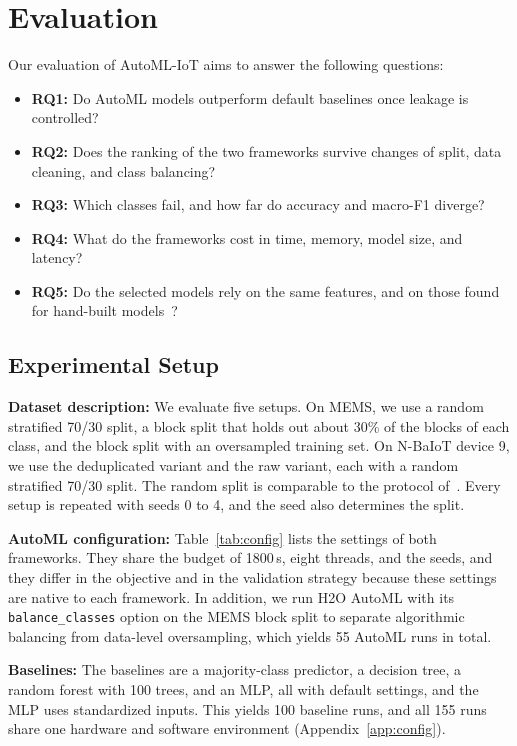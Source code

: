 \section{Evaluation}\label{sec:evaluation}
Our evaluation of AutoML-IoT aims to answer the following questions:
\begin{itemize}
\item \textbf{RQ1:} Do AutoML models outperform default baselines once leakage is controlled?
\item \textbf{RQ2:} Does the ranking of the two frameworks survive changes of split, data cleaning, and class balancing?
\item \textbf{RQ3:} Which classes fail, and how far do accuracy and macro-F1 diverge?
\item \textbf{RQ4:} What do the frameworks cost in time, memory, model size, and latency?
\item \textbf{RQ5:} Do the selected models rely on the same features, and on those found for hand-built models~\cite{gummadi2024xaiiot}?
\end{itemize}

\subsection{Experimental Setup}
\textbf{Dataset description:} We evaluate five setups. On MEMS, we use a random stratified 70/30 split, a block split that holds out about 30\% of the blocks of each class, and the block split with an oversampled training set. On N-BaIoT device 9, we use the deduplicated variant and the raw variant, each with a random stratified 70/30 split. The random split is comparable to the protocol of~\cite{gummadi2024xaiiot}. Every setup is repeated with seeds 0 to 4, and the seed also determines the split.

\textbf{AutoML configuration:} Table~\ref{tab:config} lists the settings of both frameworks. They share the budget of 1800\,s, eight threads, and the seeds, and they differ in the objective and in the validation strategy because these settings are native to each framework. In addition, we run H2O AutoML with its \texttt{balance\_classes} option on the MEMS block split to separate algorithmic balancing from data-level oversampling, which yields 55 AutoML runs in total.

\textbf{Baselines:} The baselines are a majority-class predictor, a decision tree, a random forest with 100 trees, and an MLP, all with default settings, and the MLP uses standardized inputs. This yields 100 baseline runs, and all 155 runs share one hardware and software environment (Appendix~\ref{app:config}).


